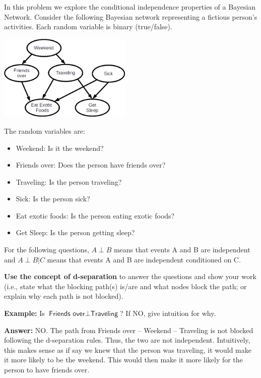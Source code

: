 \documentclass[submit]{harvardml}
\newcommand{\attr}[1]{\textsf{#1}}
\begin{document}
\begin{problem}

  \noindent In this problem we explore the conditional independence
  properties of a Bayesian Network.  Consider the following Bayesian
  network representing a fictious person's activities. Each random
  variable is binary (true/false).

\begin{center}
\includegraphics[width=2.5in]{bn.png}
\end{center}

The random variables are:

\begin{itemize}
\item \attr{Weekend}: Is it the weekend?
\item \attr{Friends over}: Does the person have friends over?
\item \attr{Traveling}: Is the person traveling?
\item \attr{Sick}: Is the person sick?
\item \attr{Eat exotic foods}: Is the person eating exotic foods?
\item \attr{Get Sleep}: Is the person getting sleep?
\end{itemize}

\medskip

For the following questions, $A \perp B$ means that events A and B are
independent and $A \perp B | C$ means that events A and B are independent
conditioned on C.

\textbf{Use the concept of d-separation} to answer the
questions and show your work (i.e., state what the blocking path(s) is/are and what nodes block the path; or explain why each path is not blocked).

\textbf{Example:} Is $\attr{Friends over} \perp \attr{Traveling}$? If NO, give intuition for why.

\textbf{Answer:} NO. The path from Friends over -- Weekend -- Traveling is not blocked following the d-separation rules. Thus, the two are not independent. Intuitively, this makes sense as if say we knew that the person was traveling, it would make it more likely to be the weekend. This would then make it more likely for the person to have friends over. 


\end{problem}
\end{document}
